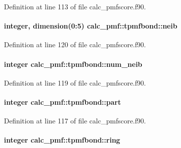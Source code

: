 Definition at line 113 of file calc\-\_\-pmfscore.\-f90.

\hypertarget{structcalc__pmf_1_1tpmfbond_a0e02380059096d336250ed8d974f1b13}{
\paragraph[{neib}]{\setlength{\rightskip}{0pt plus 5cm}integer, dimension(0\-:5) calc\-\_\-pmf\-::tpmfbond\-::neib}}\label{structcalc__pmf_1_1tpmfbond_a0e02380059096d336250ed8d974f1b13}


Definition at line 120 of file calc\-\_\-pmfscore.\-f90.

\hypertarget{structcalc__pmf_1_1tpmfbond_aaeb2d27ab41da85dff7ba86cda422cb8}{
\paragraph[{num\-\_\-neib}]{\setlength{\rightskip}{0pt plus 5cm}integer calc\-\_\-pmf\-::tpmfbond\-::num\-\_\-neib}}\label{structcalc__pmf_1_1tpmfbond_aaeb2d27ab41da85dff7ba86cda422cb8}


Definition at line 119 of file calc\-\_\-pmfscore.\-f90.

\hypertarget{structcalc__pmf_1_1tpmfbond_aede239db2a36d760cb24f4eee98b9934}{
\paragraph[{part}]{\setlength{\rightskip}{0pt plus 5cm}integer calc\-\_\-pmf\-::tpmfbond\-::part}}\label{structcalc__pmf_1_1tpmfbond_aede239db2a36d760cb24f4eee98b9934}


Definition at line 117 of file calc\-\_\-pmfscore.\-f90.

\hypertarget{structcalc__pmf_1_1tpmfbond_ac196423ed7ba0cb89992623f347447b3}{
\paragraph[{ring}]{\setlength{\rightskip}{0pt plus 5cm}integer calc\-\_\-pmf\-::tpmfbond\-::ring}}\label{structcalc__pmf_1_1tpmfbond_ac196423ed7ba0cb89992623f347447b3}


